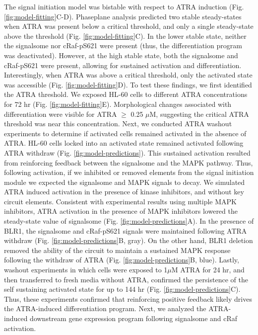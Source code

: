 \documentclass[12pt]{article}
\begin{document}

The signal initiation model was bistable with respect to ATRA induction (Fig. \ref{fig:model-fitting}C-D).
Phaseplane analysis predicted two stable steady-states when ATRA was present below a critical threshold, and only a single steady-state above the threshold (Fig. \ref{fig:model-fitting}C).
In the lower stable state, neither the signalsome nor cRaf-pS621 were present (thus, the differentiation program was deactivated).
However, at the high stable state, both the signalsome and cRaf-pS621 were present, allowing for sustained activation and differentiation.
Interestingly, when ATRA was above a critical threshold, only the activated state was accessible (Fig. \ref{fig:model-fitting}D).
To test these findings, we first identified the ATRA threshold. We exposed HL-60 cells to different ATRA concentrations for 72 hr (Fig. \ref{fig:model-fitting}E).
Morphological changes associated with differentiation were visible for ATRA $\geq$ 0.25 $\mu$M, suggesting the critical ATRA
threshold was near this concentration. Next, we conducted ATRA washout experiments to determine if activated cells remained activated in the absence of ATRA.
HL-60 cells locked into an activated state remained activated following ATRA withdraw (Fig. \ref{fig:model-predictions}).
This sustained activation resulted from reinforcing feedback between the signalsome and the MAPK pathway.
Thus, following activation, if we inhibited or removed elements from the signal initiation module we expected the signalsome and MAPK signals to decay.
We simulated ATRA induced activation in the presence of kinase inhibitors, and without key circuit elements.
Consistent with experimental results using multiple MAPK inhibitors, ATRA activation in the presence of MAPK inhibitors lowered the steady-state value of signalsome (Fig. \ref{fig:model-predictions}A).
In the presence of BLR1, the signalsome and cRaf-pS621 signals were maintained following ATRA withdraw (Fig. \ref{fig:model-predictions}B, gray).
On the other hand, BLR1 deletion removed the ability of the circuit to maintain a sustained MAPK response following the withdraw of ATRA (Fig. \ref{fig:model-predictions}B, blue).
Lastly, washout experiments in which cells were exposed to 1$\mu$M ATRA for 24 hr, and then transferred to fresh media without ATRA,
confirmed the persistence of the self sustaining activated state for up to 144 hr (Fig. \ref{fig:model-predictions}C).
Thus, these experiments confirmed that reinforcing positive feedback likely drives the ATRA-induced differentiation program.
Next, we analyzed the ATRA-induced downstream gene expression program following signalsome and cRaf activation.
\end{document}
